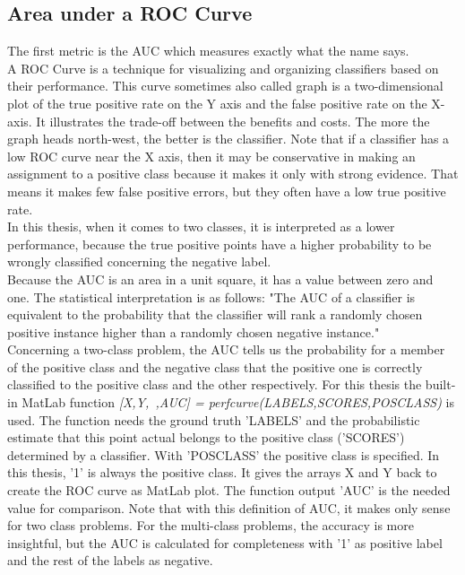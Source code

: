 \subsection{Area under a ROC Curve}
The first metric is the \ac{AUC} which measures exactly what the name says.\cite[p. 13]{Fawcett.}\\
A \ac{ROC} Curve is a technique for visualizing and organizing classifiers based on their performance.
This curve sometimes also called graph is a two-dimensional plot of the true positive rate on the Y axis and the false positive rate on the X-axis.
It illustrates the trade-off between the benefits and costs.
The more the graph heads north-west, the better is the classifier.
Note that if a classifier has a low \ac{ROC} curve near the X axis, then it may be conservative in making an assignment to a positive class because it makes it only with strong evidence.
That means it makes few false positive errors, but they often have a low true positive rate.\cite[p. 4]{Fawcett.}\\
In this thesis, when it comes to two classes, it is interpreted as a lower performance, because the true positive points have a higher probability to be wrongly classified concerning the
negative label.\\
Because the \ac{AUC} is an area in a unit square, it has a value between zero and one.
The statistical interpretation is as follows: "The \acs{AUC} of a classifier is equivalent to the probability that the classifier will rank a randomly chosen positive instance higher than a randomly chosen negative instance."\cite[p. 13-16]{Fawcett.} \\
Concerning a two-class problem, the \acs{AUC} tells us the probability for a member of the positive class and the negative class that the positive one is correctly classified to the positive class and the other respectively. 
For this thesis the built-in MatLab function \textit{[X,Y,~,AUC] = perfcurve(LABELS,SCORES,POSCLASS)} is used.
The function needs the ground truth 'LABELS' and the probabilistic estimate that this point actual belongs to the positive class ('SCORES') determined by a classifier.
With 'POSCLASS' the positive class is specified. In this thesis, '1' is always the positive class.
It gives the arrays X and Y back to create the ROC curve as MatLab plot.
The function output 'AUC' is the needed value for comparison.
Note that with this definition of \acs{AUC}, it makes only sense for two class problems.
For the multi-class problems, the accuracy is more insightful, but the \acs{AUC} is calculated for completeness with '1' as positive label and the rest of the labels as negative.\\
